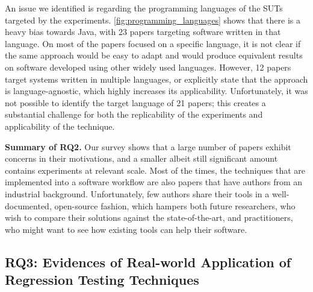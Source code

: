 An issue we identified is regarding the programming languages of the SUTs targeted by the experiments.
\autoref{fig:programming_languages} shows that there is a heavy bias towards Java, with 23 papers targeting software written in that language.
On most of the papers focused on a specific language, it is not clear if the same approach would be easy to adapt and would produce equivalent results on software developed using other widely used languages.
However, 12 papers target systems written in multiple languages, or explicitly state that the approach is language-agnostic, which highly increases its applicability.
Unfortunately, it was not possible to identify the target language of 21 papers; this creates a substantial challenge for both the replicability of the experiments and applicability of the technique.




\begin{tcolorbox}%
\textbf{Summary of RQ2.}
Our survey shows that a large number of papers exhibit \rea concerns in their motivations, and a smaller albeit still significant amount contains experiments at relevant scale. 
Most of the times, the techniques that are implemented into a software workflow are also papers that have authors from an industrial background. %
Unfortunately, few authors share their tools in a well-documented, open-source fashion, which hampers both future researchers, who wish to compare their solutions against the state-of-the-art, and practitioners, who might want to see how existing \rt tools can help their software.
\end{tcolorbox}






\subsection{RQ3: Evidences of Real-world Application of Regression Testing Techniques}
\label{sec:lit_rq3}

